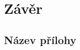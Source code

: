 \documentclass[12pt]{report}
\begin{document}
\chapter*{Závěr}


\printbibliography
{}
\printglossary[title={Zkratky}]
\listoffigures
\listoftables

\begin{appendices}
	\chapter{Název přílohy}
\end{appendices}
\end{document}
